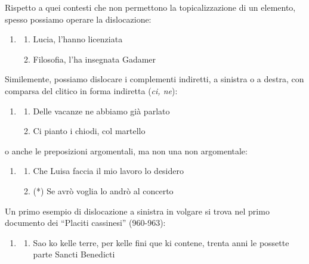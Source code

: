 \documentclass[
  a4paper,
  twoside,
  11pt,
  chapterprefix=false,
  bibliography=totocnumbered,
  listof=flat]{scrbook}
\providecommand{\tightlist}{%
  \setlength{\itemsep}{0pt}\setlength{\parskip}{0pt}}
\begin{document}
Rispetto a quei contesti che non permettono la topicalizzazione di un elemento, spesso possiamo operare la dislocazione:

\begin{enumerate}
\def\labelenumi{(\arabic{enumi})}
\setcounter{enumi}{170}
\item
  \begin{enumerate}
  \def\labelenumii{\alph{enumii}.}
  \tightlist
  \item
    Lucia, l'hanno licenziata
  \item
    Filosofia, l'ha insegnata Gadamer
  \end{enumerate}
\end{enumerate}

Similemente, possiamo dislocare i complementi indiretti, a sinistra o a destra, con comparsa del clitico in forma indiretta (\emph{ci, ne}):

\begin{enumerate}
\def\labelenumi{(\arabic{enumi})}
\setcounter{enumi}{171}
\item
  \begin{enumerate}
  \def\labelenumii{\alph{enumii}.}
  \tightlist
  \item
    Delle vacanze ne abbiamo già parlato
  \item
    Ci pianto i chiodi, col martello
  \end{enumerate}
\end{enumerate}

o anche le preposizioni argomentali, ma non una non argomentale:

\begin{enumerate}
\def\labelenumi{(\arabic{enumi})}
\setcounter{enumi}{172}
\item
  \begin{enumerate}
  \def\labelenumii{\alph{enumii}.}
  \tightlist
  \item
    Che Luisa faccia il mio lavoro lo desidero
  \item
    (*) Se avrò voglia lo andrò al concerto
  \end{enumerate}
\end{enumerate}

Un primo esempio di dislocazione a sinistra in volgare si trova nel primo documento dei \enquote{Placiti cassinesi} (960-963):

\begin{enumerate}
\def\labelenumi{(\arabic{enumi})}
\setcounter{enumi}{173}
\item
  \begin{enumerate}
  \def\labelenumii{\alph{enumii}.}
  \tightlist
  \item
    Sao ko kelle terre, per kelle fini que ki contene, trenta anni le possette parte Sancti Benedicti
  \end{enumerate}
\end{enumerate}
\end{document}

